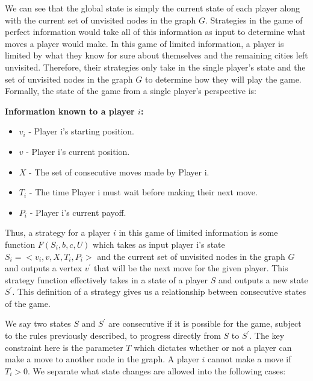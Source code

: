 \documentclass[pageno]{jpaper}
\begin{document}
We can see that the global state is simply the current state of each player along with the current set of unvisited nodes in the graph $G$. Strategies in the game of perfect information would take all of this information as input to determine what moves a player would make. In this game of limited information, a player is limited by what they know for sure about themselves and the remaining cities left unvisited. Therefore, their strategies only take in the single player's state and the set of unvisited nodes in the graph $G$ to determine how they will play the game. Formally, the state of the game from a single player's perspective is:\newline

\textbf{Information known to a player $i$:}\newline

\begin{itemize}
	\item $v_{i}$ - Player i's starting position.
	\item $v$ - Player i's current position.
	\item $X$ - The set of consecutive moves made by Player i.
	\item $T_{i}$ - The time Player i must wait before making their next move.
	\item $P_{i}$ - Player i's current payoff.
\end{itemize}

Thus, a strategy for a player $i$ in this game of limited information is some function $F(S_{i}, b, c, U)$ which takes as input player i's state $S_{i} = <v_{i}, v, X, T_{i}, P_{i}>$ and the current set of unvisited nodes in the graph $G$  and outputs a vertex $v^{\prime}$ that will be the next move for the given player. This strategy function effectively takes in a state of a player $S$ and outputs a new state $S^{\prime}$. This definition of a strategy gives us a relationship between consecutive states of the game.\par

We say two states $S$ and $S^{\prime}$ are consecutive if it is possible for the game, subject to the rules previously described, to progress directly from $S$ to $S^{\prime}$. The key constraint here is the parameter $T$ which dictates whether or not a player can make a move to another node in the graph. A player $i$ cannot make a move if $T_{i} > 0$. We separate what state changes are allowed into the following cases:\newline
\end{document}
